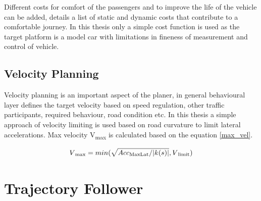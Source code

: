 Different costs for comfort of the passengers and to improve the life of the vehicle can be added, \cite{traj_planner_optimization} details a list of static and dynamic costs that contribute to a comfortable journey. In this thesis only a simple cost function is used as the target platform is a model car with limitations in fineness of measurement and control of vehicle. 

\subsection{Velocity Planning}
Velocity planning is an important aspect of the planer, in general behavioural layer defines the target velocity based on speed regulation, other traffic participants, required behaviour, road condition etc. In this thesis a simple approach of velocity limiting is used based on road curvature to limit lateral accelerations. Max velocity  V\textsubscript{max} is calculated based on the equation \ref{max_vel}. 

\begin{equation}
    V\textsubscript{max} = min(\sqrt{Acc\textsubscript{MaxLat} / |k(s)|} , V\textsubscript{limit})
\label{max_vel}
\end{equation}

\section{Trajectory Follower} \label{traj_follower}

